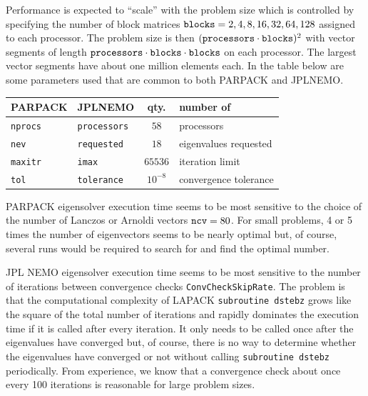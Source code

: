 \documentclass[twoside,12pt]{article}
\begin{document}
Performance is expected to ``scale'' with the problem size
which is controlled by specifying the number of block matrices
        $\mbox{\tt blocks} = 2, 4, 8, 16, 32, 64, 128$
assigned to each processor.  The problem size is then
$(\mbox{\tt processors}\cdot\mbox{\tt blocks})^2$
with vector segments of length
$\mbox{\tt processors}\cdot\mbox{\tt blocks}\cdot\mbox{\tt blocks}$
on each processor.
The largest vector segments have about one million elements each.
In the table below are some parameters used that are common to both 
PARPACK and JPLNEMO.
\begin{center}
\begin{tabular}{l|l|c|l}
PARPACK		&JPLNEMO		&qty.	&number of		\\
\hline
{\tt nprocs}	&{\tt processors}	&$58$	&processors		\\
{\tt nev}	&{\tt requested}	&$18$	&eigenvalues requested	\\
{\tt maxitr}	&{\tt imax}		&$65536$&iteration limit	\\
{\tt tol}	&{\tt tolerance}	&$10^{-8}$&convergence tolerance
\end{tabular}
\end{center}

PARPACK eigensolver execution time seems to be most sensitive to
the choice of the number of Lanczos or Arnoldi vectors $\mbox{\tt ncv} = 80$.
For small problems, 4 or 5 times
the number of eigenvectors seems to be nearly optimal
but, of course, several runs would be required
to search for and find the optimal number.

JPL NEMO eigensolver execution time seems to be most sensitive to
the number of iterations between convergence checks {\tt ConvCheckSkipRate}.
The problem is that
the computational complexity of LAPACK {\tt subroutine dstebz}
grows like the square of the total number of iterations
and rapidly dominates the execution time
if it is called after every iteration.
It only needs to be called once after the eigenvalues have converged
but, of course, there is no way to determine whether the eigenvalues
have converged or not without calling {\tt subroutine dstebz} periodically.
From experience, we know that
a convergence check about once every 100 iterations
is reasonable for large problem sizes.
\end{document}
